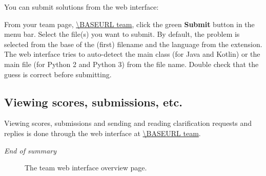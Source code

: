 You can submit solutions%
from the web interface:
\begin{description}[\breaklabel\setlabelstyle{\bfseries}]
\item[Web interface]
From your team page, \url{\BASEURL team}, click the green \textbf{Submit}
button in the menu bar. Select the file(s) you want to submit.
By default, the problem is selected from the base of the (first)
filename and the language from the extension. The web interface tries
to auto-detect the main class (for Java and Kotlin) or the main file (for
Python 2 and Python 3) from the file name. Double check that the guess is
correct before submitting.
\end{description}

\subsection*{Viewing scores, submissions, etc.}

Viewing scores, submissions and sending and reading clarification
requests and replies is done through the web interface at
\url{\BASEURL team}.

\emph{End of summary}

\begin{figure}[p]
  \centering
  \caption{The team web interface overview page.}
  \label{fig:team-overview}
\end{figure}

